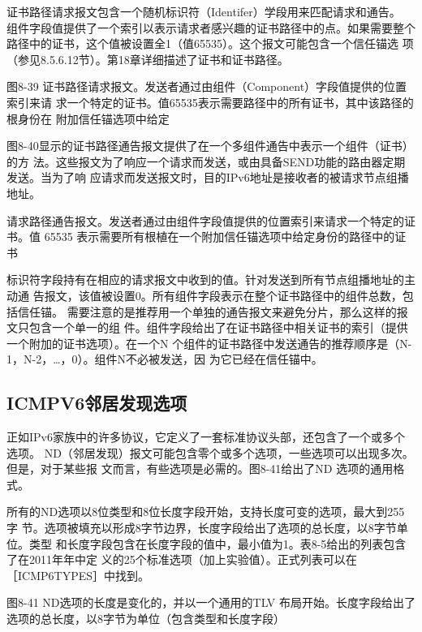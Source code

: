 证书路径请求报文包含一个随机标识符（Identifer）学段用来匹配请求和通告。
组件字段值提供了一个索引以表示请求者感兴趣的证书路径中的点。如果需要整个
路径中的证书，这个值被设置全1（值65535）。这个报文可能包含一个信任锚选
项（参见8.5.6.12节）。第18章详细描述了证书和证书路径。

图8-39 证书路径请求报文。发送者通过由组件（Component）字段值提供的位置索引来请
求一个特定的证书。值65535表示需要路径中的所有证书，其中该路径的根身份在
附加信任锚选项中给定

图8-40显示的证书路径通告报文提供了在一个多组件通告中表示一个组件（证书）的方
法。这些报文为了响应一个请求而发送，或由具备SEND功能的路由器定期发送。当为了响
应请求而发送报文时，目的IPv6地址是接收者的被请求节点组播地址。

请求路径通告报文。发送者通过由组件字段值提供的位置索引来请求一个特定的证书。值
65535 表示需要所有根植在一个附加信任锚选项中给定身份的路径中的证书

标识符字段持有在相应的请求报文中收到的值。针对发送到所有节点组播地址的主动通
告报文，该值被设置0。所有组件字段表示在整个证书路径中的组件总数，包括信任锚。
需要注意的是推荐用一个单独的通告报文来避免分片，那么这样的报文只包含一个单一的组
件。组件字段给出了在证书路径中相关证书的索引（提供一个附加的证书选项）。在一个N
个组件的证书路径中发送通告的推荐顺序是（N-1，N-2，\dots，0）。组件N不必被发送，因
为它已经在信任锚中。

\subsection{ICMPV6邻居发现选项}
正如IPv6家族中的许多协议，它定义了一套标准协议头部，还包含了一个或多个选项。
ND（邻居发现）报文可能包含零个或多个选项，一些选项可以出现多次。但是，对于某些报
文而言，有些选项是必需的。图8-41给出了ND 选项的通用格式。

所有的ND选项以8位类型和8位长度字段开始，支持长度可变的选项，最大到255字
节。选项被填充以形成8字节边界，长度字段给出了选项的总长度，以8字节单位。类型
和长度字段包含在长度字段的值中，最小值为1。表8-5给出的列表包含了在2011年年中定
义的25个标准选项（加上实验值）。正式列表可以在［ICMP6TYPES］中找到。

图8-41 ND选项的长度是变化的，并以一个通用的TLV 布局开始。长度字段给出了
选项的总长度，以8字节为单位（包含类型和长度字段）

